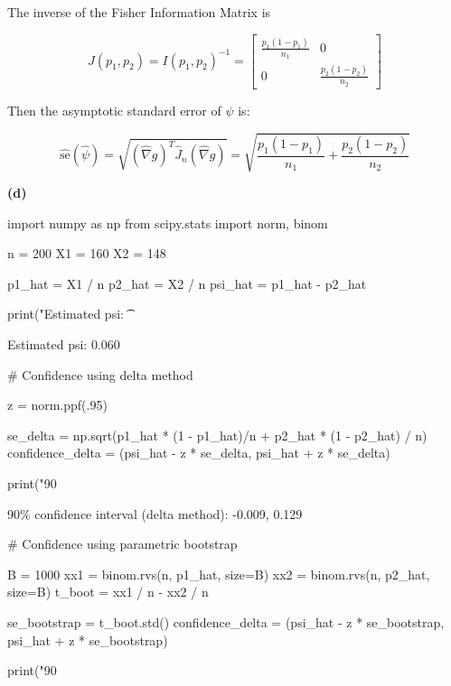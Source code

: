 The inverse of the Fisher Information Matrix is

\[J(p_1, p_2) = I(p_1, p_2)^{-1} = \begin{bmatrix}
\frac{p_1(1 - p_1)}{n_1} & 0 \\
0 & \frac{p_2(1 - p_2)}{n_2}
\end{bmatrix}\]

Then the asymptotic standard error of \(\hat{\psi}\) is:

\[\hat{\text{se}}(\hat{\psi}) = \sqrt{(\hat{\nabla} g)^T \hat{J}_n (\hat{\nabla} g)}
= \sqrt{\frac{p_1(1 - p_1)}{n_1} + \frac{p_2(1 - p_2)}{n_2}}\]

\textbf{(d)}

\begin{python}
import numpy as np
from scipy.stats import norm, binom

n = 200
X1 = 160
X2 = 148
\end{python}

\begin{python}
p1_hat = X1 / n
p2_hat = X2 / n
psi_hat = p1_hat - p2_hat

print("Estimated psi: \t %
\end{python}

\begin{console}
Estimated psi:   0.060
\end{console}

\begin{python}
# Confidence using delta method

z = norm.ppf(.95)

se_delta = np.sqrt(p1_hat * (1 - p1_hat)/n + p2_hat * (1 - p2_hat) / n)
confidence_delta = (psi_hat - z * se_delta, psi_hat + z * se_delta)

print("90%
\end{python}

\begin{console}
90\% confidence interval (delta method):          -0.009, 0.129
\end{console}

\begin{python}
# Confidence using parametric bootstrap

B = 1000
xx1 = binom.rvs(n, p1_hat, size=B)
xx2 = binom.rvs(n, p2_hat, size=B)
t_boot = xx1 / n - xx2 / n

se_bootstrap = t_boot.std()
confidence_delta = (psi_hat - z * se_bootstrap, psi_hat + z * se_bootstrap)

print("90%
\end{python}

